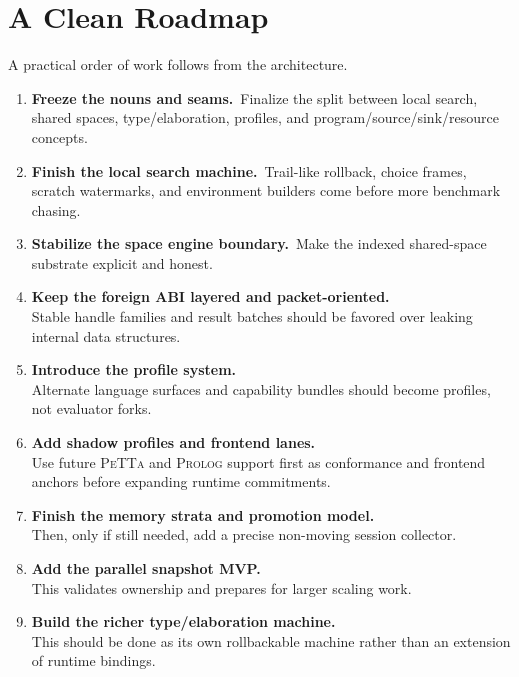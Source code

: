 \documentclass[11pt]{article}
\newcommand{\petta}{\textsc{PeTTa}}
\newcommand{\prolog}{\textsc{Prolog}}
\begin{document}
\section{A Clean Roadmap}

A practical order of work follows from the architecture.

\begin{enumerate}[leftmargin=2em]
  \item \textbf{Freeze the nouns and seams.}\
  Finalize the split between local search, shared spaces, type/elaboration, profiles, and program/source/sink/resource concepts.

  \item \textbf{Finish the local search machine.}\
  Trail-like rollback, choice frames, scratch watermarks, and environment builders come before more benchmark chasing.

  \item \textbf{Stabilize the space engine boundary.}\
  Make the indexed shared-space substrate explicit and honest.

  \item \textbf{Keep the foreign ABI layered and packet-oriented.}\\
  Stable handle families and result batches should be favored over leaking internal data structures.

  \item \textbf{Introduce the profile system.}\\
  Alternate language surfaces and capability bundles should become profiles, not evaluator forks.

  \item \textbf{Add shadow profiles and frontend lanes.}\\
  Use future \petta{} and \prolog{} support first as conformance and frontend anchors before expanding runtime commitments.

  \item \textbf{Finish the memory strata and promotion model.}\\
  Then, only if still needed, add a precise non-moving session collector.

  \item \textbf{Add the parallel snapshot MVP.}\\
  This validates ownership and prepares for larger scaling work.

  \item \textbf{Build the richer type/elaboration machine.}\\
  This should be done as its own rollbackable machine rather than an extension of runtime bindings.
\end{enumerate}
\end{document}
